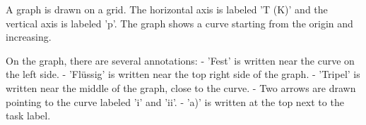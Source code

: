 A graph is drawn on a grid. The horizontal axis is labeled 'T (K)' and the vertical axis is labeled 'p'. The graph shows a curve starting from the origin and increasing. 

On the graph, there are several annotations:
- 'Fest' is written near the curve on the left side.
- 'Flüssig' is written near the top right side of the graph.
- 'Tripel' is written near the middle of the graph, close to the curve.
- Two arrows are drawn pointing to the curve labeled 'i' and 'ii'.
- 'a)' is written at the top next to the task label.
